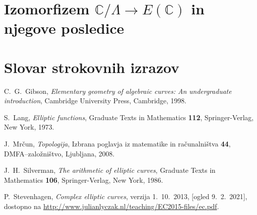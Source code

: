 \documentclass[mat1]{fmfdelo}
\newcommand{\C}{\mathbb C}
\theoremstyle{definition}
\begin{document}


\section{Izomorfizem \texorpdfstring{$\C/\Lambda \to E(\C)$}{} in njegove posledice} \label{poglavje izomorfizem}


\break

\section*{Slovar strokovnih izrazov}

\geslo{}{}
\geslo{}{}


\begin{thebibliography}{99}
    
        C.~G.~Gibson, \emph{Elementary geometry of algebraic curves: An undergraduate introduction}, Cambridge University Press, Cambridge, 1998.
    
        S.~Lang, \emph{Elliptic functions}, Graduate Texts in Mathematics \textbf{112}, Springer-Verlag, New York, 1973.

        J.~Mrčun, \emph{Topologija}, Izbrana poglavja iz matematike in računalništva \textbf{44}, DMFA--založništvo, Ljubljana, 2008.
    
        J.~H.~Silverman, \emph{The arithmetic of elliptic curves}, Graduate Texts in Mathematics \textbf{106}, Springer-Verlag, New York, 1986.

        P.~Stevenhagen, \emph{Complex elliptic curves}, verzija 1.~10.~2013, [ogled 9.~2.~2021], dostopno na \url{http://www.julianlyczak.nl/teaching/EC2015-files/ec.pdf}.
    
\end{thebibliography}
\end{document}
